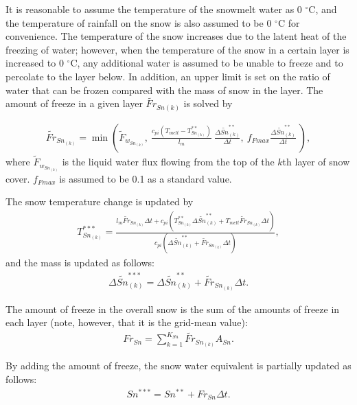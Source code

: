It is reasonable to assume the temperature of the snowmelt water as 0 \(^\circ\mathrm{C}\), and the temperature of rainfall on the snow is also assumed to be 0 \(^\circ\mathrm{C}\) for convenience.
The temperature of the snow increases due to the latent heat of the freezing of water; however, when the temperature of the snow in a certain layer is increased to 0 \(^\circ\mathrm{C}\), any
additional water is assumed to be unable to freeze and to percolate to the layer below. In addition, an upper limit is set on the ratio of water that can be frozen compared with the mass of snow in
the layer. The amount of freeze in a given layer \(\widetilde{Fr}_{Sn(k)}\) is solved by

\begin{eqnarray}
\widetilde{Fr}_{Sn_{(k)}} = \min\left(
\widetilde{F}_{w_{Sn_{(k)}}}, \
\frac{c_{pi}(T_{melt}-T_{Sn_{(k)}}^{\ast\ast})}{l_m} \
\frac{\Delta\widetilde{Sn}_{(k)}^{\ast\ast}}{\Delta t} , \
f_{Fmax}\frac{\Delta\widetilde{Sn}_{(k)}^{\ast\ast}}{\Delta t} \
\right), \label{8-21}
\end{eqnarray} where \(\widetilde{F}_{w_{Sn_{(k)}}}\) is the liquid water flux flowing from the top of the \(k\)th layer of snow cover. \(f_{Fmax}\) is assumed to be 0.1 as a standard value.

The snow temperature change is updated by \begin{eqnarray}
T_{Sn_{(k)}}^{\ast\ast\ast} = \frac{l_m \widetilde{Fr}_{Sn_{(k)}}\Delta t
 + c_{pi}(T_{Sn_{(k)}}^{\ast\ast} \Delta\widetilde{Sn}_{(k)}^{\ast\ast}
 + T_{melt} \widetilde{Fr}_{Sn_{(k)}}\Delta t)}
 {c_{pi}(\Delta\widetilde{Sn}_{(k)}^{\ast\ast} + \widetilde{Fr}_{Sn_{(k)}}\Delta t)}, \label{8-22}
\end{eqnarray} and the mass is updated as follows: \begin{eqnarray}
\Delta\widetilde{Sn}_{(k)}^{\ast\ast\ast} = \Delta\widetilde{Sn}_{(k)}^{\ast\ast} + \widetilde{Fr}_{Sn_{(k)}}\Delta t. \label{8-23}
\end{eqnarray}

The amount of freeze in the overall snow is the sum of the amounts of freeze in each layer (note, however, that it is the grid-mean value): \begin{eqnarray}
Fr_{Sn} = \sum_{k=1}^{K_{Sn}} \widetilde{Fr}_{Sn_{(k)}} A_{Sn}. \label{8-24}
\end{eqnarray}

By adding the amount of freeze, the snow water equivalent is partially updated as follows: \begin{eqnarray}
Sn^{\ast\ast\ast} = Sn^{\ast\ast} + Fr_{Sn} \Delta t. \label{8-25}
\end{eqnarray}

